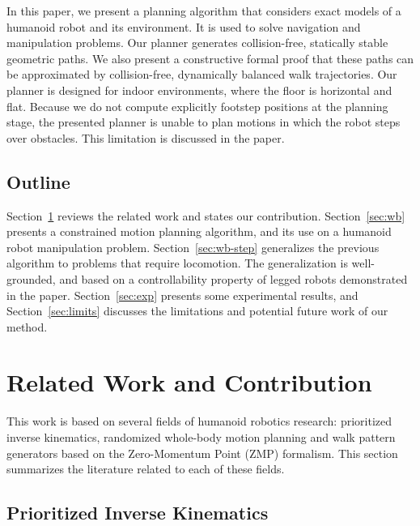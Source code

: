 \documentclass{article}
\begin{document}
In this paper, we present a planning algorithm that considers exact models of a humanoid
robot and its environment. It is used to solve navigation and manipulation problems. Our planner 
generates collision-free, statically stable 
geometric paths. We also present a constructive formal proof that these paths can be approximated by
collision-free, dynamically balanced walk trajectories. Our planner is designed for indoor
environments, where the floor is horizontal and flat. Because we do not compute explicitly footstep
positions at the planning stage, the presented planner is unable to plan motions in which the
robot steps over obstacles. This limitation is discussed in the paper.


\subsection{Outline}
Section~\ref{sec:related} reviews the related work and states our contribution. 
Section~\ref{sec:wb} presents a constrained motion planning algorithm, and its
use on a humanoid robot manipulation problem. Section~\ref{sec:wb-step} generalizes
the previous algorithm to problems that require locomotion. The generalization is
well-grounded, and
based on a controllability property of legged robots demonstrated in the paper. 
Section~\ref{sec:exp} presents some experimental results, and 
Section~\ref{sec:limits} discusses the limitations and potential future work of our
method.


\section{Related Work and Contribution}
\label{sec:related}


This work is based on several fields of humanoid robotics
research: prioritized inverse kinematics, randomized  whole-body  motion
planning and walk pattern generators based on the Zero-Momentum
Point (ZMP) formalism. This section summarizes the literature related to each of 
these fields.

\subsection{Prioritized Inverse Kinematics}
\end{document}
